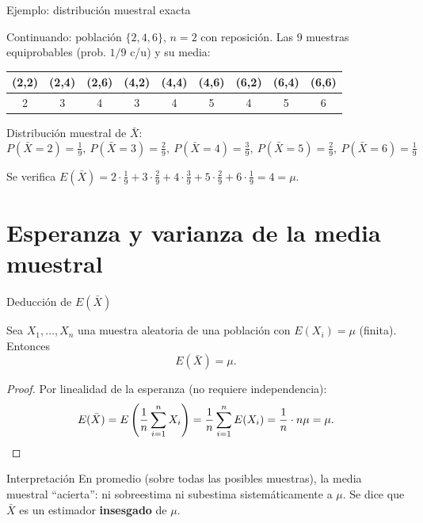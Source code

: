 \documentclass[aspectratio=169,11pt]{beamer}
\begin{document}
\begin{frame}{Ejemplo: distribución muestral exacta}
\begin{example}
Continuando: población $\{2,4,6\}$, $n=2$ con reposición. Las 9 muestras equiprobables (prob. $1/9$ c/u) y su media:
\begin{center}
\begin{tabular}{ccccccccc}
\toprule
(2,2)&(2,4)&(2,6)&(4,2)&(4,4)&(4,6)&(6,2)&(6,4)&(6,6)\\
\midrule
2&3&4&3&4&5&4&5&6\\
\bottomrule
\end{tabular}
\end{center}

Distribución muestral de $\bar X$:
$$P(\bar X=2)=\tfrac19,\ P(\bar X=3)=\tfrac29,\ P(\bar X=4)=\tfrac39,\ P(\bar X=5)=\tfrac29,\ P(\bar X=6)=\tfrac19$$

Se verifica $E(\bar X) = 2\cdot\tfrac19+3\cdot\tfrac29+4\cdot\tfrac39+5\cdot\tfrac29+6\cdot\tfrac19 = 4 = \mu$.
\end{example}
\end{frame}

\section{Esperanza y varianza de la media muestral}

\begin{frame}{Deducción de $E(\bar X)$}
\begin{theorem}
Sea $X_1,\dots,X_n$ una muestra aleatoria de una población con $E(X_i)=\mu$ (finita). Entonces
$$E(\bar X) = \mu.$$
\end{theorem}

\begin{proof}
Por linealidad de la esperanza (no requiere independencia):
$$E(\bar X) = E\left(\frac{1}{n}\sum_{i=1}^n X_i\right) = \frac{1}{n}\sum_{i=1}^n E(X_i) = \frac{1}{n}\cdot n\mu = \mu. \qedhere$$
\end{proof}

\begin{alertblock}{Interpretación}
En promedio (sobre todas las posibles muestras), la media muestral ``acierta'': ni sobreestima ni subestima sistemáticamente a $\mu$. Se dice que $\bar X$ es un estimador \textbf{insesgado} de $\mu$.
\end{alertblock}
\end{frame}
\end{document}

